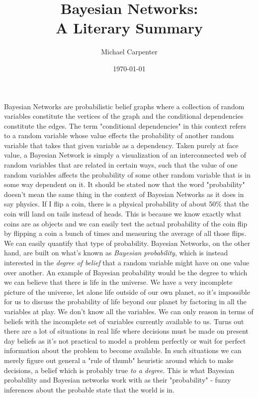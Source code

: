 \documentclass{article}
\title{Bayesian Networks: \\ A Literary Summary}
\author{Michael Carpenter}
\date{\today}
\begin{document}
\maketitle

Bayesian Networks are probabilistic belief graphs where a collection of random variables constitute the vertices of the graph and the conditional dependencies constitute the edges. The term "conditional dependencies" in this context refers to a random variable whose value effects the probability of another random variable that takes that given variable as a dependency. Taken purely at face value, a Bayesian Network is simply a visualization of an interconnected web of random variables that are related in certain ways, such that the value of one random variables affects the probability of some other random variable that is in some way dependent on it.
  It should be stated now that the word "probability" doesn't mean the same thing in the context of Bayesian Networks as it does in say physics. If I flip a coin, there is a physical probability of about 50\% that the coin will land on tails instead of heads. This is because we know exactly what coins are as objects and we can easily test the actual probability of the coin flip by flipping a coin a bunch of times and measuring the average of all those flips. We can easily quantify that type of probability. Bayesian Networks, on the other hand, are built on what's known as \emph{Bayesian probability}, which is instead interested in the \emph{degree of belief} that a random variable might have on one value over another. An example of Bayesian probability would be the degree to which we can believe that there is life in the universe. We have a very incomplete picture of the universe, let alone life outside of our own planet, so it's impossible for us to discuss the probability of life beyond our planet by factoring in all the variables at play. We don't know all the variables. We can only reason in terms of beliefs with the incomplete set of variables currently available to us. Turns out there are a lot of situations in real life where decisions must be made on present day beliefs as it's not practical to model a problem perfectly or wait for perfect information about the problem to become available. In such situations we can merely figure out general a "rule of thumb" heuristic around which to make decisions, a belief which is probably true \emph{to a degree}. This is what Bayesian probability and Bayesian networks work with as their "probability" - fuzzy inferences about the probable state that the world is in.
\end{document}
